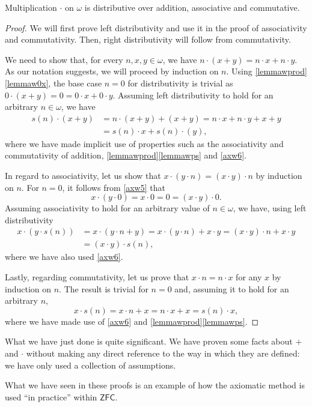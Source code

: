 \begin{proposition}
Multiplication $\cdot$ on $\omega$ is distributive over addition, associative and commutative.
\label{<+label+>}
\end{proposition}

\begin{proof}
We will first prove left distributivity and use it in the proof of associativity and commutativity.
Then, right distributivity will follow from commutativity.

We need to show that, for every $n,x,y\in \omega$, we have $n\cdot (x+y) = n\cdot x + n\cdot y$.
As our notation suggests, we will proceed by induction on $n$. Using \ref{lemmawprod}\ref{lemmaw0x}, the base case $n=0$ for distributivity is trivial as $0\cdot (x+y) = 0 = 0\cdot x + 0\cdot y$.
Assuming left distributivity to hold for an arbitrary $n\in \omega$, we have
\begin{align*}
s(n) \cdot (x + y) &= n\cdot(x+y) + (x+y) = n\cdot x + n\cdot y + x + y \\
&= s(n) \cdot x + s(n) \cdot (y),
\end{align*}
where we have made implicit use of properties such as the associativity and commutativity of addition, \ref{lemmawprod}\ref{lemmawps} and \ref{axw6}.

In regard to associativity, let us show that $x\cdot(y \cdot n) = (x\cdot y) \cdot n$ by induction on $n$. For $n=0$, it follows from \ref{axw5} that 
\[ x \cdot (y \cdot 0) = x\cdot 0 = 0 = (x\cdot y)\cdot 0.\]
Assuming associativity to hold for an arbitrary value of $n\in \omega$, we have, using left distributivity 
\begin{align*}
x\cdot (y\cdot s(n) ) &= x\cdot (y \cdot n + y) = x \cdot (y \cdot n) + x \cdot y = (x\cdot y)\cdot n + x\cdot y \\
&= (x\cdot y) \cdot s(n),
\end{align*}
where we have also used \ref{axw6}.

Lastly, regarding commutativity, let us prove that $x \cdot n = n \cdot x$ for any $x$ by induction on $n$. The result is trivial for $n = 0$ and, assuming it to hold for an arbitrary $n$,
\[ x \cdot s(n) = x \cdot n + x = n \cdot x + x = s(n) \cdot x,\]
where we have made use of \ref{axw6} and \ref{lemmawprod}\ref{lemmawps}.
\end{proof}

\begin{para}
What we have just done is quite significant. We have proven some facts about $+$ and $\cdot$ without making any direct reference to the way in which they are defined: we have only used a collection of assumptions.

What we have seen in these proofs is an example of how the axiomatic method is used ``in practice'' within $\mathsf{ZFC}$.
\end{para}

